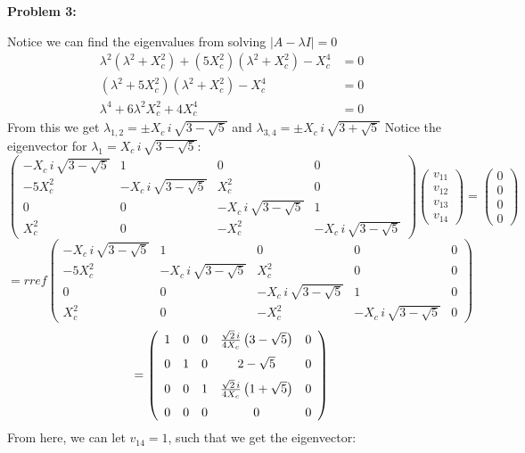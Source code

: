 \documentclass[11pt]{article}
\newcommand{\spacer}{\noalign{\medskip}}
\newenvironment{problem}[1]{\textbf{Problem #1: }}{\newpage}
\begin{document}
\begin{problem}{3}
\begin{enumerate}[label = (\alph*)]
			Notice we can find the eigenvalues from solving $|A - \lambda I| = 0$
			\begin{align*}
				\lambda^2(\lambda^2 + X^2_c) + (5X^2_c)(\lambda^2 + X^2_c) - X^4_c &= 0 \\
				(\lambda^2 + 5X^2_c)(\lambda^2 + X^2_c) - X^4_c &= 0 \\
				\lambda^4 + 6\lambda^2 X^2_c + 4X^4_c &= 0 
			\end{align*}
			From this we get $\lambda_{1,2} = \pm X_c \,i\,\sqrt{3 - \sqrt{5}}$ and $\lambda_{3,4} = \pm X_c \,i\,\sqrt{3 + \sqrt{5}}$
			\newpage
			Notice the eigenvector for $\lambda_1 = X_c\,i\,\sqrt{3 - \sqrt{5}}$:
			\[\begin{pmatrix}
				-X_c\,i\,\sqrt{3 - \sqrt{5}} & 1 & 0 & 0 \\
				-5X^2_c & -X_c\,i\,\sqrt{3 - \sqrt{5}} & X^2_c & 0 \\
				0 & 0 & -X_c\,i\,\sqrt{3 - \sqrt{5}} & 1 \\
				X^2_c & 0 & -X^2_c & -X_c\,i\,\sqrt{3 - \sqrt{5}}
			\end{pmatrix}\begin{pmatrix}
				v_{11} \\ v_{12} \\ v_{13} \\ v_{14}
			\end{pmatrix} = \begin{pmatrix}
				0 \\ 0 \\ 0 \\ 0
			\end{pmatrix} \]
			\[= rref\begin{pmatrix}
				-X_c\,i\,\sqrt{3 - \sqrt{5}} & 1 & 0 & 0 & 0 \\
				-5X^2_c & -X_c\,i\,\sqrt{3 - \sqrt{5}} & X^2_c & 0 & 0 \\
				0 & 0 & -X_c\,i\,\sqrt{3 - \sqrt{5}} & 1 & 0\\
				X^2_c & 0 & -X^2_c & -X_c\,i\,\sqrt{3 - \sqrt{5}} & 0
			\end{pmatrix} \]
			\[= \left(\begin{array}{ccccc}
				1 & 0 & 0 & \frac{\sqrt{2}\,i}{4X_c}\left(3 - \sqrt{5}\right) & 0 \\
				\spacer 0 & 1 & 0 & 2 - \sqrt{5} & 0 \\
				\spacer 0 & 0 & 1 & \frac{\sqrt{2}\,i}{4X_c}\left(1 + \sqrt{5}\right) & 0 \\
				\spacer 0 & 0 & 0 & 0 & 0
			\end{array}\right)\]
			From here, we can let $v_{14} = 1$, such that we get the eigenvector: 

\end{enumerate}
\end{problem}
\end{document}

